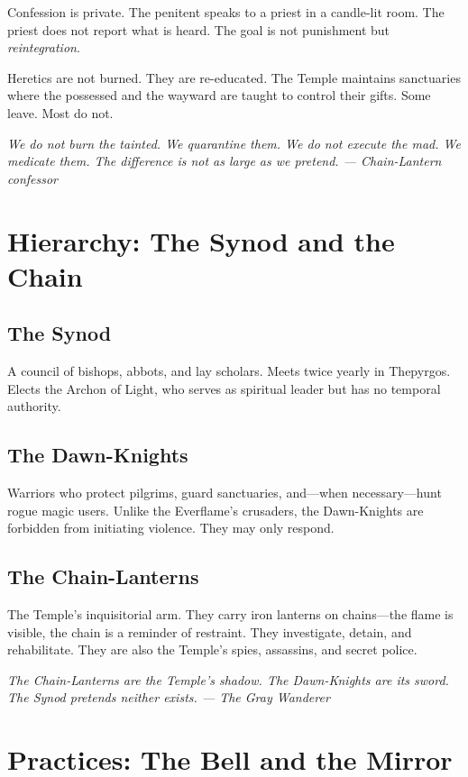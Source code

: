 \documentclass{book}
\newcommand{\citation}[1]{\textcolor{marginalia}{\small\textit{#1}}}
\begin{document}
Confession is private. The penitent speaks to a priest in a candle-lit room. The priest does not report what is heard. The goal is not punishment but \textit{reintegration}.

Heretics are not burned. They are re-educated. The Temple maintains sanctuaries where the possessed and the wayward are taught to control their gifts. Some leave. Most do not.

\citation{We do not burn the tainted. We quarantine them. We do not execute the mad. We medicate them. The difference is not as large as we pretend. --- Chain-Lantern confessor}

\chapter{Hierarchy: The Synod and the Chain}

\section{The Synod}

A council of bishops, abbots, and lay scholars. Meets twice yearly in Thepyrgos. Elects the Archon of Light, who serves as spiritual leader but has no temporal authority.

\section{The Dawn-Knights}

Warriors who protect pilgrims, guard sanctuaries, and---when necessary---hunt rogue magic users. Unlike the Everflame's crusaders, the Dawn-Knights are forbidden from initiating violence. They may only respond.

\section{The Chain-Lanterns}

The Temple's inquisitorial arm. They carry iron lanterns on chains---the flame is visible, the chain is a reminder of restraint. They investigate, detain, and rehabilitate. They are also the Temple's spies, assassins, and secret police.

\citation{The Chain-Lanterns are the Temple's shadow. The Dawn-Knights are its sword. The Synod pretends neither exists. --- The Gray Wanderer}

\chapter{Practices: The Bell and the Mirror}
\end{document}
